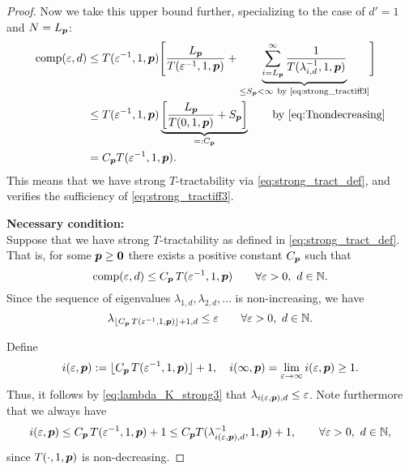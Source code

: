 \documentclass[11pt,a4paper]{article}
\begin{document}
\begin{proof}
Now we take this upper bound further, specializing to the case of $d'=1$ and $N=L_{\boldsymbol{p}}$:
\begin{align*}
       \operatorname{comp}(\varepsilon,d)
       & \le T(\varepsilon^{-1},1, \boldsymbol{p}) \Biggl [ \frac{L_{\boldsymbol{p}}}{T(\varepsilon^{-1},1, \boldsymbol{p})}  + \underbrace{\sum_{i=L_{\boldsymbol{p}}}^\infty \frac{1}{T(\lambda_{i, d}^{-1},1,\boldsymbol{p})}}_{\le S_{\boldsymbol{p}} <\infty\ \text{by \eqref{eq:strong_tractiff3}} }
        \Biggr] \\
       & \le T(\varepsilon^{-1},1,\boldsymbol{p}) \underbrace{\left[\frac{L_{\boldsymbol{p}}}{T(0,1, \boldsymbol{p})} + S_{\boldsymbol{p}} \right]}_{=:C_{\boldsymbol{p}}}
       \qquad \text{by \eqref{eq:Tnondecreasing}}\\
       & =  C_{\boldsymbol{p}}T(\varepsilon^{-1},1,\boldsymbol{p}).
\end{align*}
This means that we have strong $T$-tractability via \eqref{eq:strong_tract_def}, and verifies the sufficiency of \eqref{eq:strong_tractiff3}.



\bigskip
\noindent \textbf{Necessary condition:} \\
Suppose that we have strong
$T$-tractability as defined in \eqref{eq:strong_tract_def}. That is, for some $\boldsymbol{p} \ge \boldsymbol{0}$ there exists a positive constant $C_{\boldsymbol{p}}$ such that
\[
\operatorname{comp}(\varepsilon,d)\le C_{\boldsymbol{p}}\, T(\varepsilon^{-1},1,\boldsymbol{p})
\qquad \forall \varepsilon > 0, \ d \in \mathbb{N}.
\]
Since the sequence of eigenvalues $\lambda_{1,d}, \lambda_{2,d}, \ldots $ is non-increasing, we have
\begin{equation}\label{eq:lambda_K_strong3}
\lambda_{\lfloor C_{\boldsymbol{p}}\, T(\varepsilon^{-1},1,\boldsymbol{p})\rfloor +1,d}\le \varepsilon \qquad \forall \varepsilon > 0, \ d \in \mathbb{N}.
\end{equation}

Define
\[
i(\varepsilon,\boldsymbol{p}):= \lfloor C_{\boldsymbol{p}}\, T(\varepsilon^{-1},1,\boldsymbol{p})\rfloor +1, \quad
i(\infty,\boldsymbol{p}) = \lim_{\varepsilon \to \infty}  i(\varepsilon,\boldsymbol{p}) \ge 1 .
\]
Thus, it follows by \eqref{eq:lambda_K_strong3} that $\lambda_{i(\varepsilon,\boldsymbol{p}),d} \le \varepsilon$.
Note furthermore that we always have
\[
i(\varepsilon,\boldsymbol{p})\le C_{\boldsymbol{p}}\, T(\varepsilon^{-1},1,\boldsymbol{p})+1 \le C_{\boldsymbol{p}} T(\lambda_{i(\varepsilon,\boldsymbol{p}),d}^{-1},1,\boldsymbol{p})+1, \qquad \forall \varepsilon > 0, \ d \in \mathbb{N},
\]
since
$T(\cdot,1, \boldsymbol{p})$ is non-decreasing.


\end{proof}
\end{document}
